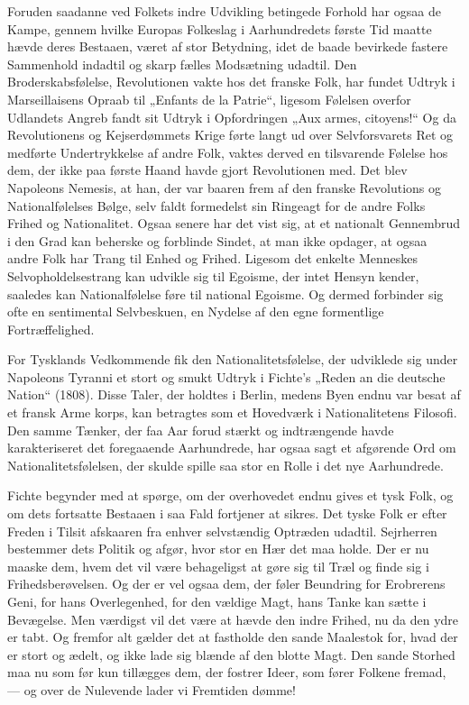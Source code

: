 \documentclass[12pt,a4paper,openany]{book}
\newcommand{\opage}[1]{\marginnote{\footnotesize\textit{[#1]}}}
\begin{document}
Foruden saadanne ved Folkets indre Udvikling betingede Forhold
har ogsaa de Kampe, gennem hvilke Europas Folkeslag i Aarhundredets
første Tid maatte hævde deres Bestaaen, været af stor Betydning,
idet de baade bevirkede fastere Sammenhold indadtil og
skarp fælles Modsætning udadtil. Den Broderskabsfølelse, Revolutionen
vakte hos det franske Folk, har fundet Udtryk i Marseillaisens
Opraab til „Enfants de la Patrie“, ligesom Følelsen overfor Udlandets
Angreb fandt sit Udtryk i Opfordringen „Aux armes, citoyens!“
Og da Revolutionens og Kejserdømmets Krige førte langt ud over
Selvforsvarets Ret og medførte Undertrykkelse af andre Folk, vaktes
derved en tilsvarende Følelse hos dem, der ikke paa første Haand
havde gjort Revolutionen med. Det blev Napoleons Nemesis, at han,
der var baaren frem af den franske Revolutions og Nationalfølelses
Bølge, selv faldt formedelst sin Ringeagt for de andre Folks Frihed
og Nationalitet. Ogsaa senere har det vist sig, at et nationalt Gennembrud
i den Grad kan beherske og forblinde Sindet, at man ikke
opdager, at ogsaa andre Folk har Trang til Enhed og Frihed. Ligesom
det enkelte Menneskes Selvopholdelsestrang kan udvikle sig til
Egoisme, der intet Hensyn kender, saaledes kan Nationalfølelse føre
til national Egoisme. Og dermed forbinder sig ofte en sentimental
Selvbeskuen, en Nydelse af den egne formentlige Fortræffelighed.


For Tysklands Vedkommende fik den Nationalitetsfølelse, der udviklede
sig under Napoleons Tyranni et stort og smukt Udtryk i
Fichte’s „Reden an die deutsche Nation“ (1808). Disse Taler, der
holdtes i Berlin, medens Byen endnu var besat af et fransk Arme%
\opage{104}korps, kan betragtes som et Hovedværk i Nationalitetens Filosofi.
Den samme Tænker, der faa Aar forud stærkt og indtrængende
havde karakteriseret det foregaaende Aarhundrede, har ogsaa sagt
et afgørende Ord om Nationalitetsfølelsen, der skulde spille saa stor
en Rolle i det nye Aarhundrede.

Fichte begynder med at spørge, om der overhovedet endnu gives
et tysk Folk, og om dets fortsatte Bestaaen i saa Fald fortjener at
sikres. Det tyske Folk er efter Freden i Tilsit afskaaren fra enhver
selvstændig Optræden udadtil. Sejrherren bestemmer dets Politik og
afgør, hvor stor en Hær det maa holde. Der er nu maaske dem, hvem
det vil være behageligst at gøre sig til Træl og finde sig i Frihedsberøvelsen.
Og der er vel ogsaa dem, der føler Beundring for
Erobrerens Geni, for hans Overlegenhed, for den vældige Magt, hans
Tanke kan sætte i Bevægelse. Men værdigst vil det være at hævde
den indre Frihed, nu da den ydre er tabt. Og fremfor alt gælder
det at fastholde den sande Maalestok for, hvad der er stort og ædelt,
og ikke lade sig blænde af den blotte Magt. Den sande Storhed maa
nu som før kun tillægges dem, der fostrer Ideer, som fører Folkene
fremad, --- og over de Nulevende lader vi Fremtiden dømme!
\end{document}
